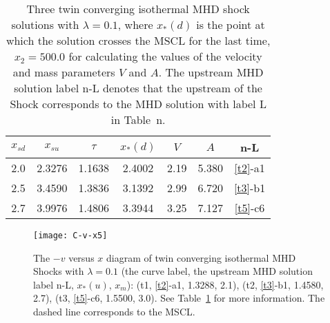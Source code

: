 \documentclass[fleqn,usenatbib]{mnras}
\begin{document}

\begin{table}
\centering
\caption{Three twin converging isothermal MHD shock solutions with $\lambda=0.1$, where $x_{*}(d)$ is the point at which the solution crosses the MSCL for the last time, $x_{2}=500.0$ for calculating the values of the velocity and mass parameters $V$ and $A$. The upstream MHD solution label n-L denotes that the upstream of the Shock corresponds to the MHD solution with label L in Table~n.}
\begin{tabular}{ccccccc}
\hline
$x_{sd}$ & $x_{su}$ & $\tau$ & $x_{*}(d)$ & $V$ & $A$ & n-L\\
\hline
2.0 & 2.3276 & 1.1638 & 2.4002 & 2.19 & 5.380 & \ref{t2}-a1\\
2.5 & 3.4590 & 1.3836 & 3.1392 & 2.99 & 6.720 & \ref{t3}-b1\\
2.7 & 3.9976 & 1.4806 & 3.3944 & 3.25 & 7.127 & \ref{t5}-c6\\
\hline
\end{tabular}
\label{t6}
\end{table}

\begin{figure}
\centering
\texttt{[image: C-v-x5]}
\caption{The $-v$ versus $x$ diagram of twin converging isothermal MHD Shocks with $\lambda=0.1$ (the curve label, the upstream MHD solution label n-L, $x_{*}(u)$, $x_{m}$): (t1, \ref{t2}-a1, 1.3288, 2.1), (t2, \ref{t3}-b1, 1.4580, 2.7), (t3, \ref{t5}-c6, 1.5500, 3.0). See Table~\ref{t6} for more information. The dashed line corresponds to the MSCL.}
\label{23}
\end{figure}


\end{document}
